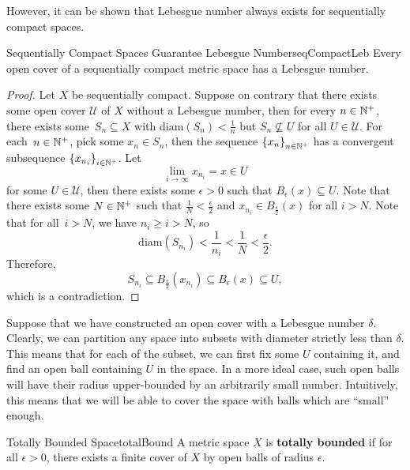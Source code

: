 \documentclass[math]{amznotes}
\theoremstyle{remark}
\begin{document}
However, it can be shown that Lebesgue number always exists for sequentially compact spaces.
\begin{probox}{Sequentially Compact Spaces Guarantee Lebesgue Number}{seqCompactLeb}
    Every open cover of a sequentially compact metric space has a Lebesgue number.
    \tcblower
    \begin{proof}
        Let $X$ be sequentially compact. Suppose on contrary that there exists some open cover $\mathcal{U}$ of $X$ without a Lebesgue number, then for every $n \in \mathbb{N}^+$, there exists some~$S_n \subseteq X$ with $\mathrm{diam}\left(S_n\right) < \frac{1}{n}$ but $S_n \not\subseteq U$ for all $U \in \mathcal{U}$. For each~$n \in \mathbb{N}^+$, pick some $x_n \in S_n$, then the sequence $\left\{x_n\right\}_{n \in \mathbb{N}^+}$ has a convergent subsequence $\left\{x_{n_i}\right\}_{i \in \mathbb{N}^+}$. Let 
        \begin{equation*}
            \lim_{i \to \infty}x_{n_i} = x \in U
        \end{equation*}
        for some $U \in \mathcal{U}$, then there exists some $\epsilon > 0$ such that $B_{\epsilon}\left(x\right) \subseteq U$. Note that there exists some $N \in \mathbb{N}^+$ such that $\frac{1}{N} < \frac{\epsilon}{2}$ and $x_{n_i} \in B_{\frac{\epsilon}{2}}\left(x\right)$ for all $i > N$. Note that for all~$i > N$, we have $n_i \geq i > N$, so 
        \begin{equation*}
            \mathrm{diam}\left(S_{n_i}\right) < \frac{1}{n_i} < \frac{1}{N} < \frac{\epsilon}{2}.
        \end{equation*}
        Therefore, 
        \begin{equation*}
            S_{n_i} \subseteq B_{\frac{\epsilon}{2}}\left(x_{n_i}\right) \subseteq B_{\epsilon}\left(x\right) \subseteq U,
        \end{equation*}
        which is a contradiction.
    \end{proof}
\end{probox}
Suppose that we have constructed an open cover with a Lebesgue number $\delta$. Clearly, we can partition any space into subsets with diameter strictly less than $\delta$. This means that for each of the subset, we can first fix some $U$ containing it, and find an open ball containing $U$ in the space. In a more ideal case, such open balls will have their radius upper-bounded by an arbitrarily small number. Intuitively, this means that we will be able to cover the space with balls which are ``small'' enough.
\begin{dfnbox}{Totally Bounded Space}{totalBound}
    A metric space $X$ is {\color{red} \textbf{totally bounded}} if for all $\epsilon > 0$, there exists a finite cover of $X$ by open balls of radius $\epsilon$.
\end{dfnbox}
\end{document}
